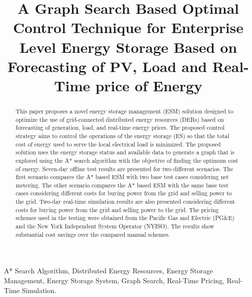 \documentclass[journal]{IEEEtran}
\begin{document}
\title{A Graph Search Based Optimal Control Technique for Enterprise Level Energy Storage Based on Forecasting of PV, Load and Real-Time price of Energy}

        
\maketitle

\begin{abstract}
This paper proposes a novel energy storage management (ESM) solution designed to optimize the use of grid-connected distributed energy resources (DERs) based on forecasting of generation, load, and real-time energy prices. The proposed control strategy aims to control the operations of the energy storage (ES) so that the total cost of energy used to serve the local electrical load is minimized. The proposed solution uses the energy storage status and available data to generate a graph that is explored using the A* search algorithm with the objective of finding the optimum cost of energy. Seven-day offline test results are presented for two different scenarios. The first scenario compares the A* based ESM with two base test cases considering net metering. The other scenario compares the A* based ESM with the same base test cases considering different costs for buying power from the grid and selling power to the grid. Two-day real-time simulation results are also presented considering different costs for buying power from the grid and selling power to the grid. The pricing schemes used in the testing were obtained from the Pacific Gas and Electric (PG\&E) and the New York Independent System Operator (NYISO). The results show substantial cost savings over the compared manual schemes. %
\end{abstract}
                                         
\begin{IEEEkeywords}
 A* Search Algorithm, Distributed Energy Resources, Energy Storage Management, Energy Storage System, Graph Search, Real-Time Pricing, Real-Time Simulation.
\end{IEEEkeywords}

\IEEEpeerreviewmaketitle
\end{document}
